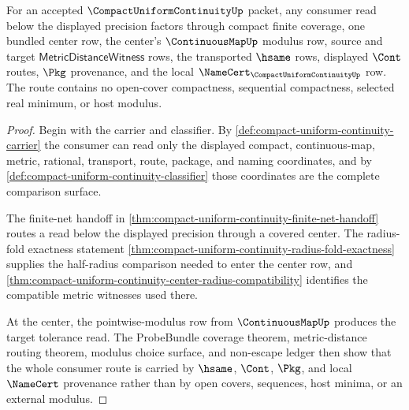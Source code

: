 \begin{theorem}
\label{thm:compact-uniform-continuity-uniform-precision-consumer-route}
For an accepted $\CompactUniformContinuityUp$ packet, any consumer read below the displayed precision factors through compact finite coverage, one bundled center row, the center's $\ContinuousMapUp$ modulus row, source and target $\mathsf{MetricDistanceWitness}$ rows, the transported $\hsame$ rows, displayed $\Cont$ routes, $\Pkg$ provenance, and the local $\NameCert_{\CompactUniformContinuityUp}$ row. The route contains no open-cover compactness, sequential compactness, selected real minimum, or host modulus.
\end{theorem}
\begin{proof}
Begin with the carrier and classifier. By \autoref{def:compact-uniform-continuity-carrier} the consumer can read only the displayed compact, continuous-map, metric, rational, transport, route, package, and naming coordinates, and by \autoref{def:compact-uniform-continuity-classifier} those coordinates are the complete comparison surface.

The finite-net handoff in \autoref{thm:compact-uniform-continuity-finite-net-handoff} routes a read below the displayed precision through a covered center. The radius-fold exactness statement \autoref{thm:compact-uniform-continuity-radius-fold-exactness} supplies the half-radius comparison needed to enter the center row, and \autoref{thm:compact-uniform-continuity-center-radius-compatibility} identifies the compatible metric witnesses used there.

At the center, the pointwise-modulus row from $\ContinuousMapUp$ produces the target tolerance read. The ProbeBundle coverage theorem, metric-distance routing theorem, modulus choice surface, and non-escape ledger then show that the whole consumer route is carried by $\hsame$, $\Cont$, $\Pkg$, and local $\NameCert$ provenance rather than by open covers, sequences, host minima, or an external modulus.
\end{proof}

